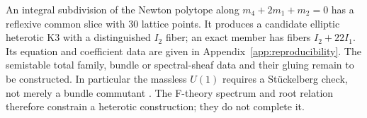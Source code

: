 An integral subdivision of the Newton polytope along
$m_4+2m_1+m_2=0$ has a reflexive common slice with $30$
lattice points. It produces a candidate elliptic heterotic K3
with a distinguished $I_2$ fiber; an exact member has fibers
$I_2+22I_1$. Its equation and coefficient data are given in
Appendix~\ref{app:reproducibility}. The semistable total family,
bundle or spectral-sheaf data and their gluing remain to be
constructed. In particular the massless $U(1)$ requires a
St\"uckelberg check, not merely a bundle commutant
\cite{Cvetic:2015uwu,Honecker:2006qz}. The F-theory spectrum
and root relation therefore constrain a heterotic construction;
they do not complete it.
